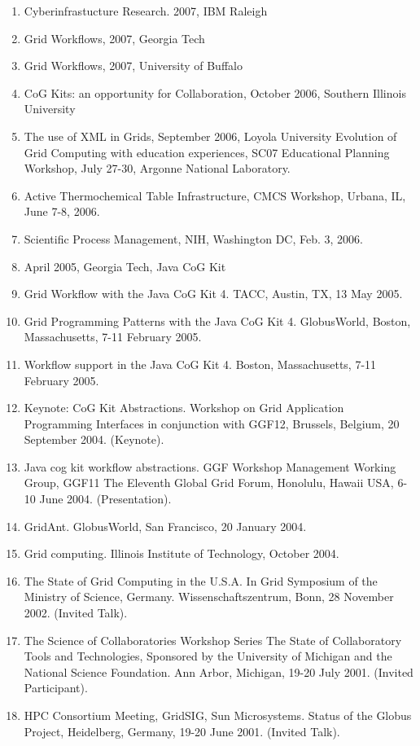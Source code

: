 \documentclass{article}
\begin{document}
\begin{enumerate}
\item  Cyberinfrastucture Research. 2007, IBM Raleigh 
\item  Grid Workflows, 2007, Georgia Tech
\item  Grid Workflows, 2007, University of Buffalo
\item  CoG Kits: an opportunity for Collaboration, October 2006, Southern Illinois University  
\item  The use of XML in Grids, September 2006, Loyola University Evolution of Grid Computing with education experiences, SC07 Educational Planning Workshop, July  27-30, Argonne National Laboratory. 
\item  Active Thermochemical Table Infrastructure, CMCS Workshop, Urbana, IL, June 7-8, 2006. 
\item  Scientific Process Management, NIH, Washington DC, Feb. 3, 2006. 
\item  April 2005, Georgia Tech, Java CoG Kit 
\item  Grid Workflow with the Java CoG Kit 4. TACC, Austin, TX, 13 May 2005. 
\item  Grid Programming Patterns with the Java CoG Kit 4. GlobusWorld, Boston, Massachusetts, 7-11 February 2005. 
\item  Workflow support in the Java CoG Kit 4. Boston, Massachusetts, 7-11 February 2005. 
\item  Keynote: CoG Kit Abstractions. Workshop on Grid Application Programming Interfaces in conjunction with GGF12, Brussels, Belgium, 20 September 2004. (Keynote). %
\item  Java cog kit workflow abstractions. GGF Workshop Management Working Group, GGF11 The Eleventh Global Grid Forum, Honolulu, Hawaii USA, 6-10 June 2004. (Presentation). 
\item  GridAnt. GlobusWorld, San Francisco, 20 January 2004. 
\item  Grid computing. Illinois Institute of Technology, October 2004. 
\item  The State of Grid Computing in the U.S.A. In Grid Symposium of the Ministry of Science, Germany. Wissenschaftszentrum, Bonn, 28 November 2002. (Invited Talk). 
\item  The Science of Collaboratories Workshop Series The State of Collaboratory Tools and Technologies, Sponsored by the University of Michigan and the National Science Foundation. Ann Arbor, Michigan, 19-20 July 2001. (Invited Participant). 
\item  HPC Consortium Meeting, GridSIG, Sun Microsystems. Status of the Globus Project, Heidelberg, Germany, 19-20 June 2001. (Invited Talk). %

\end{enumerate}
\end{document}
